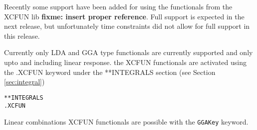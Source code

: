 \begin{description}
Recently some support have been added for using the functionals from the XCFUN lib \textbf{fixme: insert proper reference}. Full 
support is expected in the next release, but unfortunately time constraints did not allow for 
full support in this release. 

Currently only LDA and GGA type functionals are currently supported and only upto and including 
linear response. the XCFUN functionals are activated using the .XCFUN keyword under the **INTEGRALS section (see Section \ref{sec:integral})
\begin{verbatim}
**INTEGRALS
.XCFUN
\end{verbatim} 
Linear combinations XCFUN functionals are possible with the \verb|GGAKey| keyword.

\end{description}

